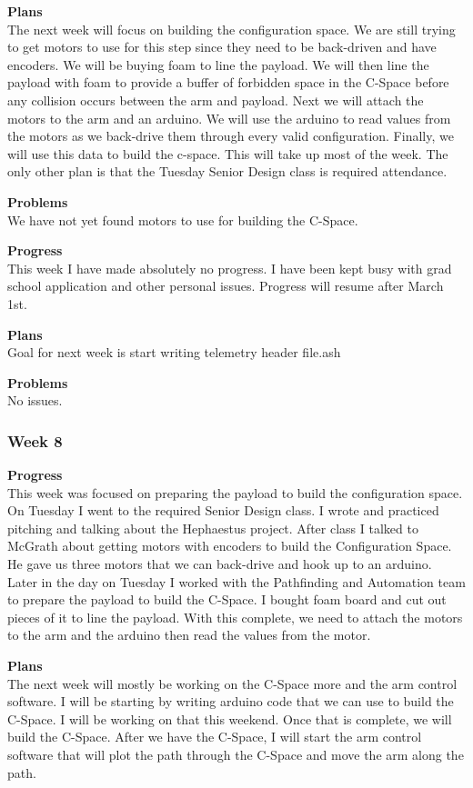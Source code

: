 \textbf{Plans} \\ 
The next week will focus on building the configuration space. We are still trying to get motors to use for this step since they need to be back-driven and have encoders. We will be buying foam to line the payload. We will then line the payload with foam to provide a buffer of forbidden space in the C-Space before any collision occurs between the arm and payload. Next we will attach the motors to the arm and an arduino. We will use the arduino to read values from the motors as we back-drive them through every valid configuration. Finally, we will use this data to build the c-space. This will take up most of the week. The only other plan is that the Tuesday Senior Design class is required attendance.

\textbf{Problems} \\ 
We have not yet found motors to use for building the C-Space.

\textbf{Progress} \\
This week I have made absolutely no progress. I have been kept busy with grad 
school application and other personal issues. Progress will resume after March
1st.

\textbf{Plans} \\
Goal for next week is start writing telemetry header file.ash

\textbf{Problems} \\
No issues.

\subsubsection{Week 8}
\textbf{Progress} \\ 
This week was focused on preparing the payload to build the configuration space. On Tuesday I went to the required Senior Design class. I wrote and practiced pitching and talking about the Hephaestus project. After class I talked to McGrath about getting motors with encoders to build the Configuration Space. He gave us three motors that we can back-drive and hook up to an arduino. Later in the day on Tuesday I worked with the Pathfinding and Automation team to prepare the payload to build the C-Space. I bought foam board and cut out pieces of it to line the payload. With this complete, we need to attach the motors to the arm and the arduino then read the values from the motor.

\textbf{Plans} \\ 
The next week will mostly be working on the C-Space more and the arm control software. I will be starting by writing arduino code that we can use to build the C-Space. I will be working on that this weekend. Once that is complete, we will build the C-Space. After we have the C-Space, I will start the arm control software that will plot the path through the C-Space and move the arm along the path.

